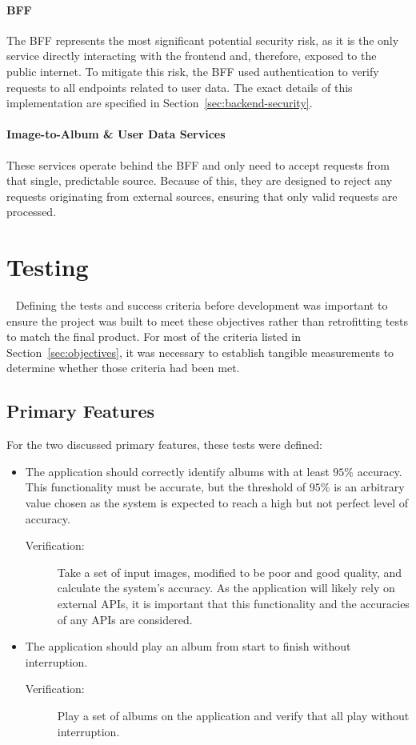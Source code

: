 \paragraph{BFF} The BFF represents the most significant potential security risk, as it is the only service directly interacting with the frontend and, therefore, exposed to the public internet. To mitigate this risk, the BFF used authentication to verify requests to all endpoints related to user data. The exact details of this implementation are specified in Section~\ref{sec:backend-security}.

\paragraph{Image-to-Album \& User Data Services} These services operate behind the BFF and only need to accept requests from that single, predictable source. Because of this, they are designed to reject any requests originating from external sources, ensuring that only valid requests are processed.

\section{Testing}~\label{sec:test-design}
Defining the tests and success criteria before development was important to ensure the project was built to meet these objectives rather than retrofitting tests to match the final product. For most of the criteria listed in Section~\ref{sec:objectives}, it was necessary to establish tangible measurements to determine whether those criteria had been met.

\subsection{Primary Features}
For the two discussed primary features, these tests were defined:
\begin{itemize}
    \item The application should correctly identify albums with at least $95\%$ accuracy. This functionality must be accurate, but the threshold of $95\%$ is an arbitrary value chosen as the system is expected to reach a high but not perfect level of accuracy.
    \begin{description}
        \item[Verification:] Take a set of input images, modified to be poor and good quality, and calculate the system's accuracy. As the application will likely rely on external APIs, it is important that this functionality and the accuracies of any APIs are considered.
    \end{description}
    \item The application should play an album from start to finish without interruption.
    \begin{description}
        \item[Verification:] Play a set of albums on the application and verify that all play without interruption.
    \end{description}
\end{itemize}


